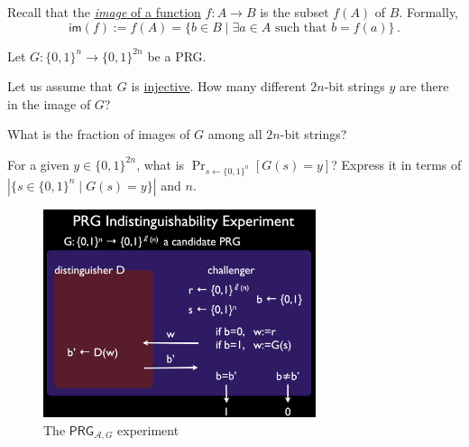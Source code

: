 \documentclass[a4paper,10pt,landscape,twocolumn]{scrartcl}
\begin{document}
\begin{exercise}
Recall that the \href{https://en.wikipedia.org/wiki/Image_(mathematics)}{\emph{image} of a function} $f:A \rightarrow B$ is the subset $f(A)$ of $B$. Formally, 
\[ \mathsf{im}(f) := f(A) = \{b \in B \mid \exists a \in A \mbox{ such that } b=f(a) \} \, .
\]

Let $G:\{0,1\}^n \rightarrow \{0,1\}^{2n}$ be a PRG. 

\begin{subex}
Let us assume that $G$ is \href{https://en.wikipedia.org/wiki/Injective_function}{injective}. How many different $2n$-bit strings $y$ are there in the image of $G$?
\end{subex}

\begin{subex}
What is the fraction of images of $G$ among all $2n$-bit strings?
\end{subex}

\begin{subex}
For a given $y \in \{0,1\}^{2n}$, what is $\Pr_{s \leftarrow \{0,1\}^n}[G(s) = y]$? Express it in terms of $|\{s \in \{0,1\}^n \mid G(s)=y\} |$ and $n$.
\end{subex}

\end{exercise}

\begin{figure}[h]
\center
\includegraphics[width=8cm]{PRGExperiment.jpg}
\caption{The $\mathsf{PRG}_{\mathcal{A},G}$ experiment \label{fig}}
\end{figure}
\end{document}
